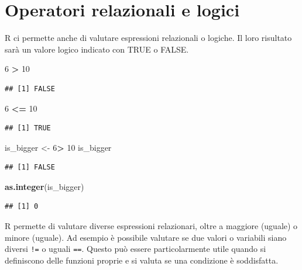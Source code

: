 \documentclass[]{book}
\newenvironment{Shaded}{\begin{snugshade}}{\end{snugshade}}
\newcommand{\DecValTok}[1]{\textcolor[rgb]{0.00,0.00,0.81}{#1}}
\newcommand{\KeywordTok}[1]{\textcolor[rgb]{0.13,0.29,0.53}{\textbf{#1}}}
\newcommand{\NormalTok}[1]{#1}
\newcommand{\OperatorTok}[1]{\textcolor[rgb]{0.81,0.36,0.00}{\textbf{#1}}}
\newcommand{\StringTok}[1]{\textcolor[rgb]{0.31,0.60,0.02}{#1}}
\begin{document}
\hypertarget{operatori-relazionali-e-logici}{%
\section{Operatori relazionali e logici}\label{operatori-relazionali-e-logici}}

R ci permette anche di valutare espressioni relazionali o logiche. Il loro risultato sarà un valore logico indicato con TRUE o FALSE.

\begin{Shaded}
\begin{Highlighting}[]
\DecValTok{6} \OperatorTok{>}\StringTok{ }\DecValTok{10}
\end{Highlighting}
\end{Shaded}

\begin{verbatim}
## [1] FALSE
\end{verbatim}

\begin{Shaded}
\begin{Highlighting}[]
\DecValTok{6} \OperatorTok{<=}\StringTok{ }\DecValTok{10}
\end{Highlighting}
\end{Shaded}

\begin{verbatim}
## [1] TRUE
\end{verbatim}

\begin{Shaded}
\begin{Highlighting}[]
\NormalTok{is_bigger <-}\StringTok{ }\DecValTok{6}\OperatorTok{>}\StringTok{ }\DecValTok{10}
\NormalTok{is_bigger}
\end{Highlighting}
\end{Shaded}

\begin{verbatim}
## [1] FALSE
\end{verbatim}

\begin{Shaded}
\begin{Highlighting}[]
\KeywordTok{as.integer}\NormalTok{(is_bigger)}
\end{Highlighting}
\end{Shaded}

\begin{verbatim}
## [1] 0
\end{verbatim}

R permette di valutare diverse espressioni relazionari, oltre a maggiore (uguale) o minore (uguale). Ad esempio è possibile valutare se due valori o variabili siano diversi \texttt{!=} o uguali \texttt{==}. Questo può essere particolarmente utile quando si definiscono delle funzioni proprie e si valuta se una condizione è soddisfatta.
\end{document}
